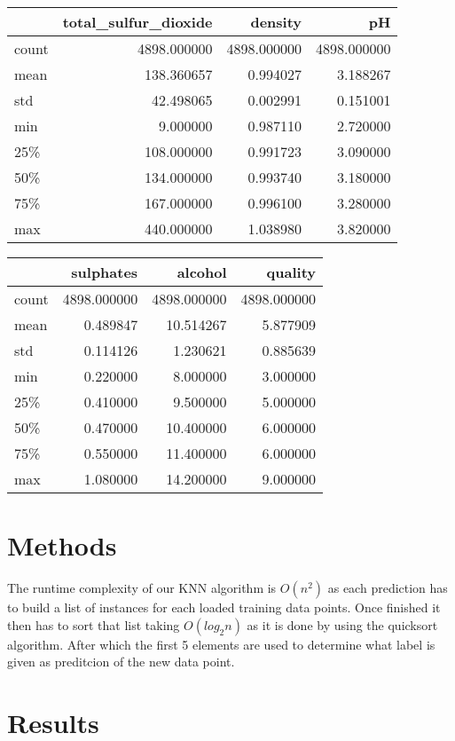 \documentclass[]{IEEEtran}
\begin{document}
\begin{table}[!h]
\begin{tabular}{lrrr}
\toprule
{} &  total\_sulfur\_dioxide &      density &           pH \\
\midrule
count &           4898.000000 &  4898.000000 &  4898.000000 \\
mean  &            138.360657 &     0.994027 &     3.188267 \\
std   &             42.498065 &     0.002991 &     0.151001 \\
min   &              9.000000 &     0.987110 &     2.720000 \\
25\%   &            108.000000 &     0.991723 &     3.090000 \\
50\%   &            134.000000 &     0.993740 &     3.180000 \\
75\%   &            167.000000 &     0.996100 &     3.280000 \\
max   &            440.000000 &     1.038980 &     3.820000 \\
\bottomrule
\end{tabular}
\end{table}
\begin{table}[!h]
\begin{tabular}{lrrr}
\toprule
{} &    sulphates &      alcohol &      quality \\
\midrule
count &  4898.000000 &  4898.000000 &  4898.000000 \\
mean  &     0.489847 &    10.514267 &     5.877909 \\
std   &     0.114126 &     1.230621 &     0.885639 \\
min   &     0.220000 &     8.000000 &     3.000000 \\
25\%   &     0.410000 &     9.500000 &     5.000000 \\
50\%   &     0.470000 &    10.400000 &     6.000000 \\
75\%   &     0.550000 &    11.400000 &     6.000000 \\
max   &     1.080000 &    14.200000 &     9.000000 \\
\bottomrule
\end{tabular}
\end{table}

\section{Methods}

The runtime complexity of our KNN algorithm is $O(n^2)$ as each prediction has to build a list of instances for each loaded training data points. 
Once finished it then has to sort that list taking $O(log_2n)$ as it is done by using the quicksort algorithm.
After which the first 5 elements are used to determine what label is given as preditcion of the new data point.



\section{Results}
\end{document}
